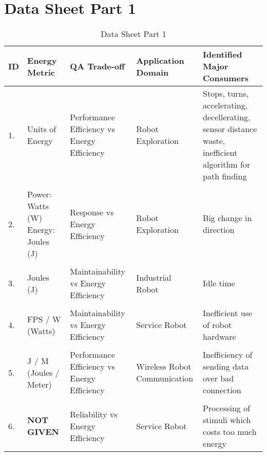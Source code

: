 \section{Data Sheet Part 1}
\label{appendix:data_sheet_1}

\begin{table}[h]
    \centering
    \caption{Data Sheet Part 1}
    \begin{tabular}{p{0.1cm}p{3cm}p{4cm}p{4cm}p{4cm}}
        \toprule
            {ID} &
                {Energy Metric}      & 
                {QA Trade-off}       & 
                {Application Domain} &
                {Identified Major Consumers}    \\
        \midrule
            {1.} &
                {Units of Energy} &
                {Performance Efficiency vs Energy Efficiency} &
                {Robot Exploration} &
                {Stops, turns, accelerating, decellerating, sensor distance waste, 
                inefficient algorithm for path finding} \\
            \hline
            \\
            {2.} &
                {Power: Watts (W)
                Energy: Joules (J)} &
                {Response vs Energy Efficiency} &
                {Robot Exploration} &
                {Big change in direction} \\
            \hline
            \\
            {3.} &
                {Joules (J)} &
                {Maintainability vs Energy Efficiency} &
                {Industrial Robot} &
                {Idle time} \\
            \hline
            \\
            {4.} &
                {FPS / W (Watts)} &
                {Maintainability vs Energy Efficiency} &
                {Service Robot} &
                {Inefficient use of robot hardware} \\
            \hline
            \\
            {5.} &
                {J / M (Joules / Meter)} &
                {Performance Efficiency vs Energy Efficiency} &
                {Wireless Robot Communication} &
                {Inefficiency of sending data over bad connection} \\
            \hline
            \\
            {6.} &
                {\textbf{NOT GIVEN}} &
                {Reliability vs Energy Efficiency} &
                {Service Robot} &
                {Processing of stimuli which costs too much energy} \\

\end{tabular}
\end{table}
